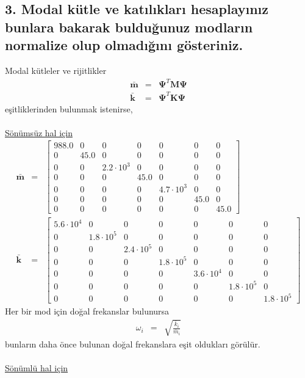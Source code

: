 \documentclass[a4paper]{report}
\begin{document}
\subsection*{3. Modal kütle ve katılıkları hesaplayınız bunlara bakarak bulduğunuz modların normalize olup olmadığını gösteriniz.}
Modal kütleler ve rijitlikler
\begin{eqnarray*}
\bar{ \mathbf{m}}&=&\mathbf{\Psi}^T\mathbf{M}\mathbf{\Psi}\\
\bar{ \mathbf{k}}&=&\mathbf{\Psi}^T\mathbf{K}\mathbf{\Psi}
\end{eqnarray*}
eşitliklerinden bulunmak istenirse,\\
~\\
\underline{Sönümsüz hal için}\\
\begin{eqnarray*}
\bar{ \mathbf{m}}&=&\left[\begin{array}{ccccccc} 988.0 & 0 & 0 & 0 & 0 & 0 & 0\\ 0 & 45.0 & 0 & 0 & 0 & 0 & 0\\ 0 & 0 & 2.2\cdot 10^3 & 0 & 0 & 0 & 0\\ 0 & 0 & 0 & 45.0 & 0 & 0 & 0\\ 0 & 0 & 0 & 0 & 4.7\cdot 10^3 & 0 & 0\\ 0 & 0 & 0 & 0 & 0 & 45.0 & 0\\ 0 & 0 & 0 & 0 & 0 & 0 & 45.0 \end{array}\right]\\
\bar{ \mathbf{k}}&=&\left[\begin{array}{ccccccc} 5.6\cdot 10^4 & 0 & 0 & 0 & 0 & 0 & 0\\ 0 & 1.8\cdot 10^5 & 0 & 0 & 0 & 0 & 0\\ 0 & 0 & 2.4\cdot 10^5 & 0 & 0 & 0 & 0\\ 0 & 0 & 0 & 1.8\cdot 10^5 & 0 & 0 & 0\\ 0 & 0 & 0 & 0 & 3.6\cdot 10^4 & 0 & 0\\ 0 & 0 & 0 & 0 & 0 & 1.8\cdot 10^5 & 0\\ 0 & 0 & 0 & 0 & 0 & 0 & 1.8\cdot 10^5 \end{array}\right]
\end{eqnarray*}
Her bir mod için doğal frekanslar bulunursa
\begin{eqnarray*}
\omega_i&=&\sqrt{\frac{\bar{k}_i}{\bar{m}_i}}
\end{eqnarray*}
bunların daha önce bulunan doğal frekanslara eşit oldukları görülür.\\
~\\
\underline{Sönümlü hal için}\\
\end{document}

